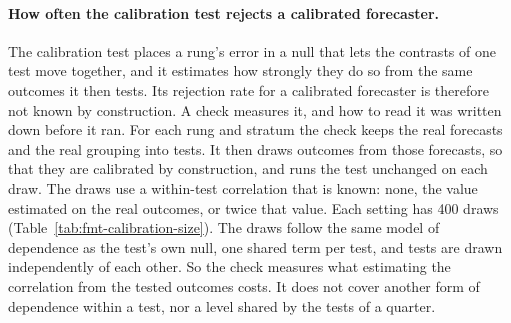 \paragraph{How often the calibration test rejects a calibrated forecaster.}\label{sec:calibration-size}
The calibration test places a rung's error in a null that lets the contrasts of one test move together, and it estimates how strongly they do so from the same outcomes it then tests. Its rejection rate for a calibrated forecaster is therefore not known by construction. A check measures it, and how to read it was written down before it ran. For each rung and stratum the check keeps the real forecasts and the real grouping into tests. It then draws outcomes from those forecasts, so that they are calibrated by construction, and runs the test unchanged on each draw. The draws use a within-test correlation that is known: none, the value estimated on the real outcomes, or twice that value. Each setting has 400 draws (Table~\ref{tab:fmt-calibration-size}). The draws follow the same model of dependence as the test's own null, one shared term per test, and tests are drawn independently of each other. So the check measures what estimating the correlation from the tested outcomes costs. It does not cover another form of dependence within a test, nor a level shared by the tests of a quarter.

